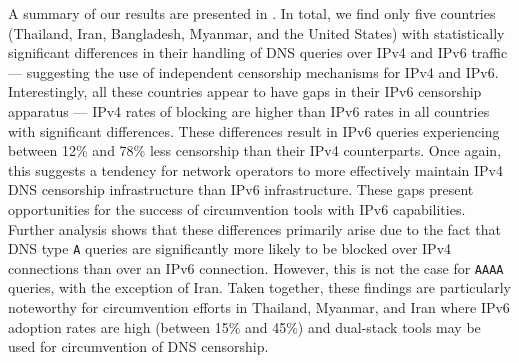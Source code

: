 A summary of our results are presented in .
In total, we find only five countries (Thailand, Iran, Bangladesh, Myanmar, and
the United States) with statistically significant differences in their handling
of DNS queries over IPv4 and IPv6 traffic --- suggesting the use of independent
censorship mechanisms for IPv4 and IPv6. 
%
Interestingly, all these countries appear to have gaps in their IPv6 censorship
apparatus --- \ie IPv4 rates of blocking are higher than IPv6 rates in all
countries with significant differences. These differences result in IPv6
queries experiencing between 12\% and 78\% less censorship than their IPv4
counterparts.
%
Once again, this suggests a tendency for network operators to more effectively
maintain IPv4 DNS censorship infrastructure than IPv6 infrastructure. These
gaps present opportunities for the success of circumvention tools with IPv6
capabilities.  
%
Further analysis shows that these differences primarily arise due to the fact
that DNS type {\tt A} queries are significantly more likely to be blocked over
IPv4 connections than over an IPv6 connection. However, this is not the case
for {\tt AAAA} queries, with the exception of Iran.
%
Taken together, these findings are particularly noteworthy for circumvention
efforts in Thailand, Myanmar, and Iran where IPv6 adoption rates are high
(between 15\% and 45\%) and dual-stack tools may be used for circumvention of
DNS censorship.
%

